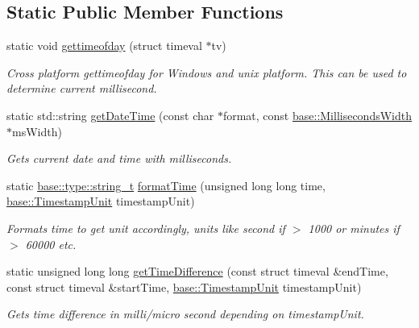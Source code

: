 \subsection*{Static Public Member Functions}
\begin{DoxyCompactItemize}
\item 
static void \hyperlink{classel_1_1base_1_1utils_1_1_date_time_ac000e6ecf705c2194a173d618ff4acfd}{gettimeofday} (struct timeval $\ast$tv)
\begin{DoxyCompactList}\small\item\em Cross platform gettimeofday for Windows and unix platform. This can be used to determine current millisecond. \end{DoxyCompactList}\item 
static std\+::string \hyperlink{classel_1_1base_1_1utils_1_1_date_time_aa813c606a98b8741f59ccdf5aacef733}{get\+Date\+Time} (const char $\ast$format, const \hyperlink{classel_1_1base_1_1_milliseconds_width}{base\+::\+Milliseconds\+Width} $\ast$ms\+Width)
\begin{DoxyCompactList}\small\item\em Gets current date and time with milliseconds. \end{DoxyCompactList}\item 
static \hyperlink{namespaceel_1_1base_1_1type_a67e406cd213c231f1d135b5a4eda64b5}{base\+::type\+::string\+\_\+t} \hyperlink{classel_1_1base_1_1utils_1_1_date_time_a1eea58fffe291c969a526d08515d29d7}{format\+Time} (unsigned long long time, \hyperlink{namespaceel_1_1base_a1b886858c6409097395b24b1bdf03c39}{base\+::\+Timestamp\+Unit} timestamp\+Unit)
\begin{DoxyCompactList}\small\item\em Formats time to get unit accordingly, units like second if $>$ 1000 or minutes if $>$ 60000 etc. \end{DoxyCompactList}\item 
static unsigned long long \hyperlink{classel_1_1base_1_1utils_1_1_date_time_a9181a3544442e1d3c05d8c96bbfff16d}{get\+Time\+Difference} (const struct timeval \&end\+Time, const struct timeval \&start\+Time, \hyperlink{namespaceel_1_1base_a1b886858c6409097395b24b1bdf03c39}{base\+::\+Timestamp\+Unit} timestamp\+Unit)
\begin{DoxyCompactList}\small\item\em Gets time difference in milli/micro second depending on timestamp\+Unit. \end{DoxyCompactList}\end{DoxyCompactItemize}


